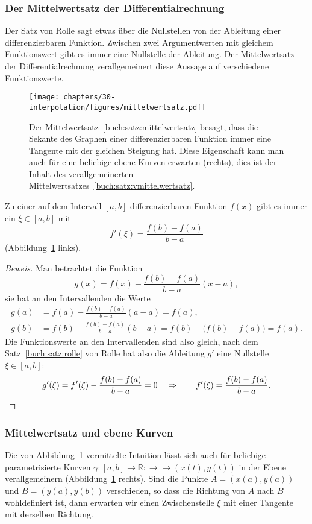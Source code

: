 \subsubsection{Der Mittelwertsatz der Differentialrechnung}
%
%
Der Satz von Rolle sagt etwas über die Nullstellen von der Ableitung
einer differenzierbaren Funktion.
%
Zwischen zwei Argumentwerten mit gleichem Funktionswert gibt es immer
eine Nullstelle der Ableitung.
Der Mittelwertsatz der Differentialrechnung verallgemeinert diese
Aussage auf verschiedene Funktionswerte.

\begin{figure}
\centering
\texttt{[image: chapters/30-interpolation/figures/mittelwertsatz.pdf]}
\caption{Der Mittelwertsatz~\ref{buch:satz:mittelwertsatz} besagt, dass
die Sekante des Graphen einer differenzierbaren Funktion immer eine
Tangente mit der gleichen Steigung hat.
Diese Eigenschaft kann man auch für eine beliebige ebene Kurven
erwarten (rechts), dies ist der Inhalt des verallgemeinerten
Mittelwertsatzes~\ref{buch:satz:vmittelwertsatz}.
\label{buch:polynome:figure:mittelwertsatz}}
\end{figure}

\begin{satz}[Mittelwertsatz]
\label{buch:satz:mittelwertsatz}
Zu einer auf dem Intervall $[a,b]$ differenzierbaren Funktion $f(x)$ gibt
es immer ein $\xi\in[a,b]$ mit
\[
f'(\xi) = \frac{f(b)-f(a)}{b-a}
\]
(Abbildung~\ref{buch:polynome:figure:mittelwertsatz} links).
\end{satz}

\begin{proof}[Beweis]
Man betrachtet die Funktion 
\[
g(x) = f(x) - \frac{f(b)-f(a)}{b-a}(x-a),
\]
sie hat an den Intervallenden die Werte
\begin{align*}
g(a) &= f(a) - \frac{f(b)-f(a)}{b-a}(a-a)=f(a),
\\
g(b) &= f(b) - \frac{f(b)-f(a)}{b-a}(b-a) = f(b) - \bigl(f(b)-f(a)\bigr) = f(a).
\end{align*}
Die Funktionswerte an den Intervallenden sind also gleich,
nach dem Satz~\ref{buch:satz:rolle} von Rolle hat also
die Ableitung $g'$ eine Nullstelle $\xi\in[a,b]$:
\[
g'(\xi) = f'(\xi) - \frac{f(b)-f(a)}{b-a} = 0
\quad
\Rightarrow
\qquad
f'(\xi) = \frac{f(b)-f(a)}{b-a}.
\qedhere
\]
\end{proof}

\subsubsection{Mittelwertsatz und ebene Kurven}
%
%
Die von Abbildung~\ref{buch:polynome:figure:mittelwertsatz} vermittelte
Intuition lässt sich auch für beliebige parametrisierte Kurven
$\gamma\colon[a,b]\to\mathbb R:\to\mapsto (x(t),y(t))$ in der Ebene
verallgemeinern (Abbildung~\ref{buch:polynome:figure:mittelwertsatz} rechts).
Sind die Punkte $A=(x(a),y(a))$ und $B=(y(a),y(b))$ verschieden,
so dass die Richtung von $A$ nach $B$ wohldefiniert ist, dann erwarten
wir einen Zwischenstelle $\xi$ mit einer Tangente mit derselben Richtung.
%

